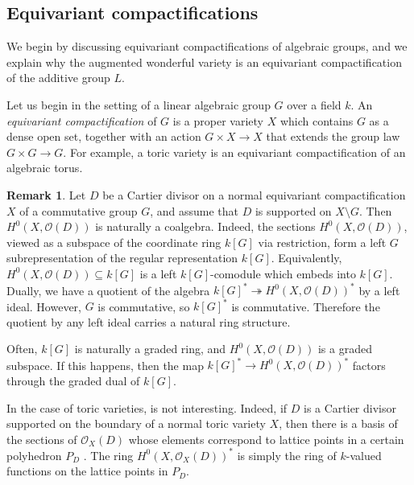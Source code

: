 \documentclass{amsart}
\newcommand{\OO}{\mathcal{O}}
\theoremstyle{definition}
\newtheorem{remark}[theorem]{Remark}
\begin{document}
\subsection{Equivariant compactifications}
We begin by discussing equivariant compactifications of algebraic groups, and we explain why the augmented wonderful variety is an 
equivariant compactification of the additive group $L$.

Let us begin in the setting of a linear algebraic group $G$ over a field $k$.
An \emph{equivariant compactification} of $G$ is a 
proper variety $X$ which contains $G$ as a dense open set, together with an 
action $G \times X \to X$ that extends the group law $G \times G \to 
G$. For example, a toric variety is an equivariant 
compactification of an algebraic torus.

\begin{remark}\label{rmk:coalgebra-structure}
Let $D$ be a Cartier divisor on a normal equivariant compactification 
$X$ of a commutative group $G$, and assume that $D$ is supported on $X \setminus G$. Then $H^0(X, \mathcal{O}(D))$ is naturally a coalgebra. Indeed, the 
sections $H^0(X,\OO(D))$, viewed as a subspace of the coordinate ring $k[G]$ via restriction,
form a left $G$ subrepresentation of the regular representation $k[G]$.
Equivalently, $H^0(X,\OO(D)) \subseteq k[G]$ is a left $k[G]$-comodule 
which embeds into $k[G]$. Dually, we have a quotient of the algebra $k[G]^* \twoheadrightarrow H^0(X, \OO(D))^*$ by a left ideal. However, $G$ 
is commutative, so $k[G]^*$ is commutative. Therefore 
the quotient by any left ideal carries a natural ring structure.
\end{remark}

Often, $k[G]$ is naturally a graded ring, and $H^0(X, \mathcal{O}(D))$ is a graded subspace. If this happens, then the map $k[G]^* \to H^0(X, \mathcal{O}(D))^*$ factors through the graded dual of $k[G]$. 

In the case of toric varieties,  is not 
interesting. Indeed, if $D$ is a Cartier divisor supported on the 
boundary of a normal toric 
variety $X$, then there is a basis of the sections of $\OO_X(D)$ whose 
elements correspond to lattice points in a certain polyhedron $P_D$ 
\cite[Page 66]{Ful93}. The ring $H^0(X, \OO_X(D))^*$ is 
simply the ring of $k$-valued functions on the lattice points in 
$P_D$.
\end{document}
